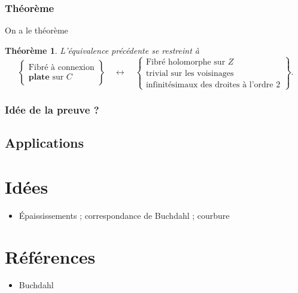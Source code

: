 \documentclass[a4paper]{amsart}
\newtheorem{thm}{Théorème}
\begin{document}
\subsubsection{Théorème}
\label{sec:orgheadline15}
On a le théorème
\begin{thm}
L'équivalence précédente se restreint à
\begin{equation*}
\left\lbrace
\begin{matrix}
\text{Fibré à connexion}\\
\textbf{plate} \text{ sur } C
\end{matrix}
\right\rbrace \quad \leftrightarrow \quad \left\lbrace
\begin{matrix}
\text{Fibré holomorphe sur }Z\\
\text{trivial sur les voisinages}\\
\text{infinitésimaux des droites à l'ordre }2
\end{matrix}
\right\rbrace.
\end{equation*}
\end{thm}

\subsubsection{Idée de la preuve ?}
\label{sec:orgheadline16}



\subsection{Applications}
\label{sec:orgheadline18}

\section{Idées}
\label{sec:orgheadline20}
\begin{itemize}
\item Épaississements ; correspondance de Buchdahl ; courbure
\end{itemize}
\section{Références}
\label{sec:orgheadline21}
\begin{itemize}
\item Buchdahl
\end{itemize}
\end{document}
